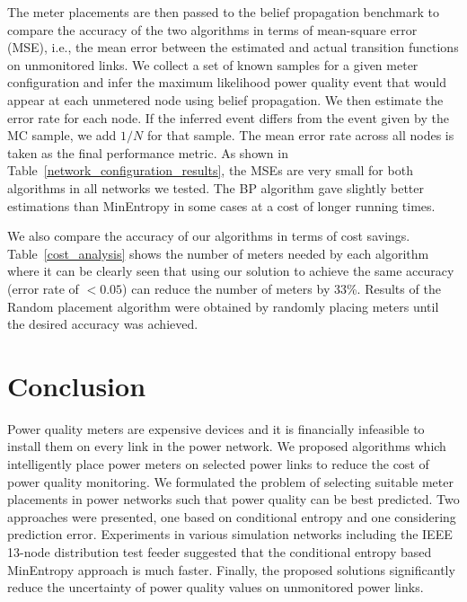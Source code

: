 The meter placements are then passed to the belief propagation benchmark to compare the accuracy of the two algorithms in terms of mean-square error (MSE), i.e., the mean error between the estimated and actual transition functions on unmonitored links. We collect a set of known samples for a given meter configuration and infer the maximum likelihood power quality event that would appear at each unmetered node using belief propagation. We then estimate the error rate for each node. If the inferred event differs from the event given by the MC sample, we add $1/N$ for that sample. The mean error rate across all nodes is taken as the final performance metric. As shown in Table~\ref{network_configuration_results}, the MSEs are very small for both algorithms in all networks we tested. The BP algorithm gave slightly better estimations than MinEntropy in some cases at a cost of longer running times.

We also compare the accuracy of our algorithms in terms of cost savings. Table~\ref{cost_analysis} shows the number of meters needed by each algorithm where it can be clearly seen that using our solution to achieve the same accuracy (error rate of $< 0.05$) can reduce the number of meters by 33\%. Results of the Random placement algorithm were obtained by randomly placing meters until the desired accuracy was achieved.


\section{Conclusion}
\label{sec:conclusion}
Power quality meters are expensive devices and it is financially infeasible to install them on every link in the power network. We proposed algorithms which intelligently place power meters on selected power links to reduce the cost of power quality monitoring. We formulated the problem of selecting suitable meter placements in power networks such that power quality can be best predicted. Two approaches were presented, one based on conditional entropy and one considering prediction error. Experiments in various simulation networks including the IEEE 13-node distribution test feeder suggested that the conditional entropy based MinEntropy approach is much faster. Finally, the proposed solutions significantly reduce the uncertainty of power quality values on unmonitored power links.